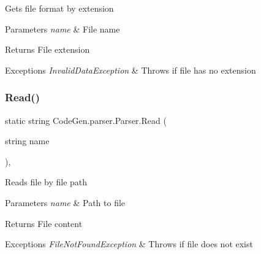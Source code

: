 Gets file format by extension 


\begin{DoxyParams}{Parameters}
{\em name} & File name\\
\hline
\end{DoxyParams}
\begin{DoxyReturn}{Returns}
File extension
\end{DoxyReturn}

\begin{DoxyExceptions}{Exceptions}
{\em Invalid\+Data\+Exception} & Throws if file has no extension\\
\hline
\end{DoxyExceptions}
\mbox{\label{classCodeGen_1_1parser_1_1Parser_af3a5d34f3773eff03e97c42b40ea3e96}} 
\subsubsection{\texorpdfstring{Read()}{Read()}}
{\footnotesize\ttfamily static string Code\+Gen.\+parser.\+Parser.\+Read (\begin{DoxyParamCaption}\item[{string}]{name }\end{DoxyParamCaption})\hspace{0.3cm}{\ttfamily [inline]}, {\ttfamily [static]}}



Reads file by file path 


\begin{DoxyParams}{Parameters}
{\em name} & Path to file\\
\hline
\end{DoxyParams}
\begin{DoxyReturn}{Returns}
File content
\end{DoxyReturn}

\begin{DoxyExceptions}{Exceptions}
{\em File\+Not\+Found\+Exception} & Throws if file does not exist\\
\hline
\end{DoxyExceptions}
\mbox{\label{classCodeGen_1_1parser_1_1Parser_aaa59afdc45cfc1c9583c40e11791fc15}} 
